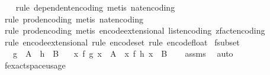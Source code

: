 \begin{isabellebody}
\ \ \isamarkupfalse%
\ {\isacharparenleft}{\kern0pt}rule\ dependent{\isacharunderscore}{\kern0pt}encoding{\isacharcomma}{\kern0pt}\ metis\ nat{\isacharunderscore}{\kern0pt}encoding{\isacharparenright}{\kern0pt}\isanewline
\ \ \isamarkupfalse%
\ {\isacharparenleft}{\kern0pt}rule\ prod{\isacharunderscore}{\kern0pt}encoding{\isacharcomma}{\kern0pt}\ metis\ nat{\isacharunderscore}{\kern0pt}encoding{\isacharparenright}{\kern0pt}\isanewline
\ \ \isamarkupfalse%
\ {\isacharparenleft}{\kern0pt}rule\ prod{\isacharunderscore}{\kern0pt}encoding{\isacharcomma}{\kern0pt}\ metis\ encode{\isacharunderscore}{\kern0pt}extensional\ list{\isacharunderscore}{\kern0pt}encoding\ zfact{\isacharunderscore}{\kern0pt}encoding{\isacharparenright}{\kern0pt}\isanewline
\ \ \isamarkupfalse%
\ {\isacharparenleft}{\kern0pt}rule\ encode{\isacharunderscore}{\kern0pt}extensional{\isacharcomma}{\kern0pt}\ rule\ encode{\isacharunderscore}{\kern0pt}set{\isacharcomma}{\kern0pt}\ rule\ encode{\isacharunderscore}{\kern0pt}float{\isacharparenright}{\kern0pt}%
\endisatagproof
{\isafoldproof}%
%
\isadelimproof
\isanewline
%
\endisadelimproof
\isanewline
{}\isamarkupfalse%
\ f{\isacharunderscore}{\kern0pt}subset{\isacharcolon}{\kern0pt}\isanewline
\ \ \ {\isachardoublequoteopen}g\ {\isacharbackquote}{\kern0pt}\ A\ {\isasymsubseteq}\ h\ {\isacharbackquote}{\kern0pt}\ B{\isachardoublequoteclose}\isanewline
\ \ \ {\isachardoublequoteopen}{\isacharparenleft}{\kern0pt}{\isasymlambda}x{\isachardot}{\kern0pt}\ f\ {\isacharparenleft}{\kern0pt}g\ x{\isacharparenright}{\kern0pt}{\isacharparenright}{\kern0pt}\ {\isacharbackquote}{\kern0pt}\ A\ {\isasymsubseteq}\ {\isacharparenleft}{\kern0pt}{\isasymlambda}x{\isachardot}{\kern0pt}\ f\ {\isacharparenleft}{\kern0pt}h\ x{\isacharparenright}{\kern0pt}{\isacharparenright}{\kern0pt}\ {\isacharbackquote}{\kern0pt}\ B{\isachardoublequoteclose}\isanewline
%
\isadelimproof
\ \ %
\endisadelimproof
%
\isatagproof
{}\isamarkupfalse%
\ assms\ \isamarkupfalse%
\ auto%
\endisatagproof
{\isafoldproof}%
%
\isadelimproof
\isanewline
%
\endisadelimproof
\isanewline
{}\isamarkupfalse%
\ f{}{\isacharunderscore}{\kern0pt}exact{\isacharunderscore}{\kern0pt}space{\isacharunderscore}{\kern0pt}usage{\isacharcolon}{\kern0pt}\isanewline
\ \ \ {\isachardoublequoteopen}{\isasymepsilon}\ {\isasymin}\ {\isacharbraceleft}{\kern0pt}{}{\isacharless}{\kern0pt}{\isachardot}{\kern0pt}{\isachardot}{\kern0pt}{\isacharless}{\kern0pt}{}{\isacharbraceright}{\kern0pt}{\isachardoublequoteclose}\isanewline

\end{isabellebody}
